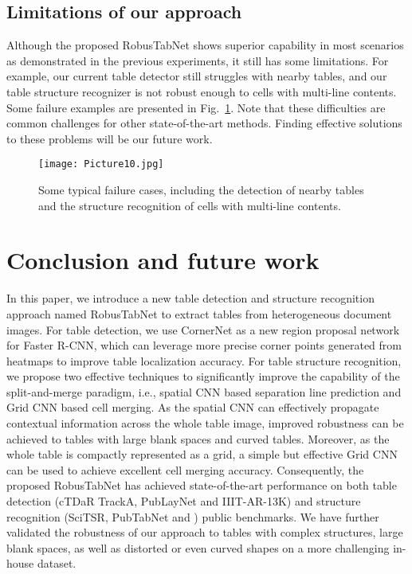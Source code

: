 \documentclass[final,3p,times,twocolumn]{elsarticle}
\begin{document}
\subsection{Limitations of our approach}
\label{subsec:limitations}
Although the proposed RobusTabNet shows superior capability in most scenarios as demonstrated in the previous experiments, it still has some limitations. For example, our current table detector still struggles with nearby tables, and our table structure recognizer is not robust enough to cells with multi-line contents. Some failure examples are presented in Fig.~\ref{fig:failure_cases}. {\color{black}{Furthermore, our TSR approach will fail on some extremely dense tables, because the predicted segmentation 
masks of nearby separation lines could be overlapped.}} Note that these difficulties are common challenges for other state-of-the-art methods. Finding effective solutions to these problems will be our future work. {\color{black}{Moreover, since the tables in existing datasets are mostly with black lines/letters and white backgrounds, the effectiveness and generalization ability of our approach on tables with different types of backgrounds, text fonts and line colors need to be studied in the future.}}
\begin{figure}[t]
    \centering
    \setlength{\abovecaptionskip}{-0.2cm}
    \texttt{[image: Picture10.jpg]}
    \caption{Some typical failure cases, including the detection of nearby tables and the structure recognition of cells with multi-line contents. }
    \label{fig:failure_cases}
\end{figure}

\section{Conclusion and future work}
\label{sec:conclusion}
In this paper, we introduce a new table detection and structure recognition approach named RobusTabNet to extract tables from heterogeneous document images. For table detection, we use CornerNet as a new region proposal network for Faster R-CNN, which can leverage more precise corner points generated from heatmaps to improve table localization accuracy. For table structure recognition, we propose two effective techniques to significantly improve the capability of the split-and-merge paradigm, i.e., spatial CNN based separation line prediction and Grid CNN based cell merging. As the spatial CNN can effectively propagate contextual information across the whole table image, improved robustness can be achieved to tables with large blank spaces and curved tables. Moreover, as the whole table is compactly represented as a grid, a simple but effective Grid CNN can be used to achieve excellent cell merging accuracy. Consequently, the proposed RobusTabNet has achieved state-of-the-art performance on both table detection (cTDaR TrackA, PubLayNet and IIIT-AR-13K) and structure recognition (SciTSR, PubTabNet and {\color{black}{cTDaR TrackB2-Modern}}) public benchmarks. We have further validated the robustness of our approach to tables with complex structures, large blank spaces, as well as distorted or even curved shapes on a more challenging in-house dataset.
\end{document}
